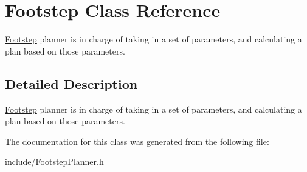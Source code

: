 \hypertarget{class_footstep}{\section{Footstep Class Reference}
\label{class_footstep}
}


\hyperlink{class_footstep}{Footstep} planner is in charge of taking in a set of parameters, and calculating a plan based on those parameters.  




\subsection{Detailed Description}
\hyperlink{class_footstep}{Footstep} planner is in charge of taking in a set of parameters, and calculating a plan based on those parameters. 

The documentation for this class was generated from the following file\-:\begin{DoxyCompactItemize}
\item 
include/Footstep\-Planner.\-h\end{DoxyCompactItemize}
